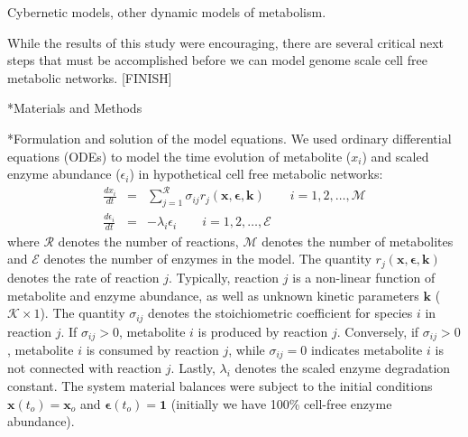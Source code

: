 \documentclass[12pt]{article}
\makeatletter
\renewcommand\subsection{\@startsection
	{subsection}{2}{0mm}
	{-0.05in}
	{-0.5\baselineskip}
	{\normalfont\normalsize\bfseries}}
\renewcommand\section{\@startsection
	{subsection}{2}{0mm}
	{-0.2in}
	{0.05\baselineskip}
	{\normalfont\large\bfseries}}
\makeatother
\begin{document}
Cybernetic models, other dynamic models of metabolism. 

While the results of this study were encouraging, there are several critical next steps that must be accomplished before we can model genome scale cell free metabolic networks.
[FINISH]

\clearpage

\section*{Materials and Methods}

\subsection*{Formulation and solution of the model equations.}
We used ordinary differential equations (ODEs) to model the time evolution of metabolite ($x_{i}$) and scaled enzyme abundance ($\epsilon_{i}$) in hypothetical cell free
metabolic networks:
\begin{eqnarray}
	\frac{dx_{i}}{dt} & = & \sum_{j = 1}^{\mathcal{R}}\sigma_{ij}r_{j}\left(\mathbf{x},\mathbf{\epsilon},\mathbf{k}\right)\qquad{i=1,2,\hdots,\mathcal{M}}\\
	\frac{d\epsilon_{i}}{dt} & = & -\lambda_{i}\epsilon_{i}\qquad{i = 1,2,\hdots,\mathcal{E}}
\end{eqnarray}where $\mathcal{R}$ denotes the number of reactions, $\mathcal{M}$ denotes the number of metabolites and $\mathcal{E}$ denotes the number of
enzymes in the model. The quantity $r_{j}\left(\mathbf{x},\mathbf{\epsilon},\mathbf{k}\right)$ 
denotes the rate of reaction $j$. Typically, reaction $j$ is a non-linear function of metabolite and enzyme abundance, as well as unknown kinetic parameters 
$\mathbf{k}$ ($\mathcal{K}\times{1}$).
The quantity $\sigma_{ij}$ denotes the stoichiometric coefficient for species $i$ in reaction $j$. If 
$\sigma_{ij}>0$, metabolite $i$ is produced by reaction $j$. Conversely, if $\sigma_{ij}>0$, metabolite $i$ is consumed by reaction $j$, while $\sigma_{ij} = 0$ indicates
metabolite $i$ is not connected with reaction $j$. Lastly, $\lambda_{i}$ denotes the scaled enzyme degradation constant. The system material balances were subject to the
initial conditions $\mathbf{x}\left(t_{o}\right) = \mathbf{x}_{o}$ and $\mathbf{\epsilon}\left(t_{o}\right) = \mathbf{1}$ (initially we have 100\% cell-free enzyme abundance).
\end{document}
